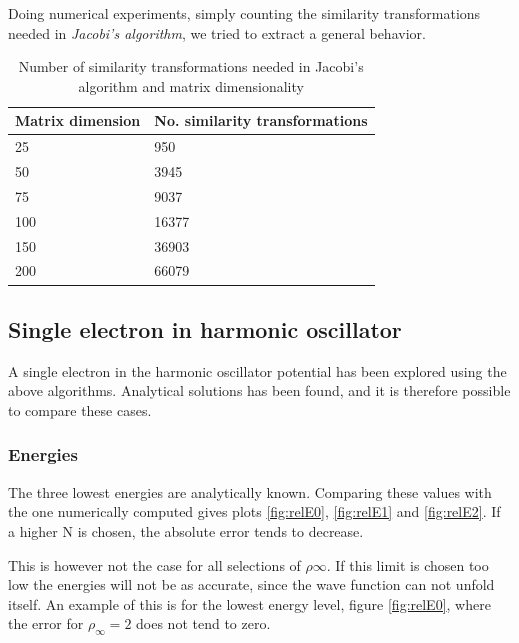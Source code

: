 \documentclass[11pt,a4paper,english,final]{article}
\numberwithin{equation}{section}
\begin{document}
Doing numerical experiments, simply counting the similarity transformations needed in \emph{Jacobi's algorithm}, we tried to extract a general behavior.   

\begin{table}[H]
\centering
  \caption{Number of similarity transformations needed in Jacobi's algorithm and matrix dimensionality }
\vspace{3mm}

\begin{tabular}{ |l|l| }
  \hline
  \textbf{Matrix dimension} & \textbf{No. similarity transformations} \\
  \hline
  25 & 950 \\
  \hline
  50 & 3945 \\
  \hline
  75  & 9037 \\
  \hline
  100 & 16377 \\
  \hline
  150 & 36903 \\
  \hline
  200 & 66079 \\
  \hline
\end{tabular}
\vspace{0.5cm}
\end{table}


\subsection{Single electron in harmonic oscillator}

A single electron in the harmonic oscillator potential has been 
explored using the above algorithms. Analytical solutions has been
found, and it is therefore possible to compare these cases.

\subsubsection{Energies}

The three lowest energies are analytically known. Comparing these values
with the one numerically computed gives plots \ref{fig:relE0}, 
\ref{fig:relE1} and \ref{fig:relE2}. If a higher N is chosen, the 
absolute error tends to decrease.

This is however not the case for all selections 
of $\rho\infty$. If this limit is chosen too low the energies will 
not be as accurate, since the wave function can not unfold itself.
An example of this is for the lowest energy level, figure \ref{fig:relE0},
where the error for $\rho_\infty = 2$ does not tend to zero.
\end{document}

